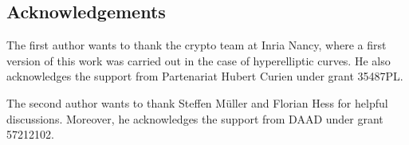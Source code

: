 \documentclass[main.tex]{subfiles}
\begin{document}
  \subsection{Acknowledgements}

  The first author wants to thank the crypto team at Inria Nancy, where
  a first version of this work was carried out in the case of hyperelliptic
  curves. He also acknowledges the support from Partenariat Hubert Curien under
  grant 35487PL.

  The second author wants to thank Steffen Müller and Florian Hess for helpful discussions.
  Moreover, he acknowledges the support from DAAD under grant 57212102.
\end{document}

